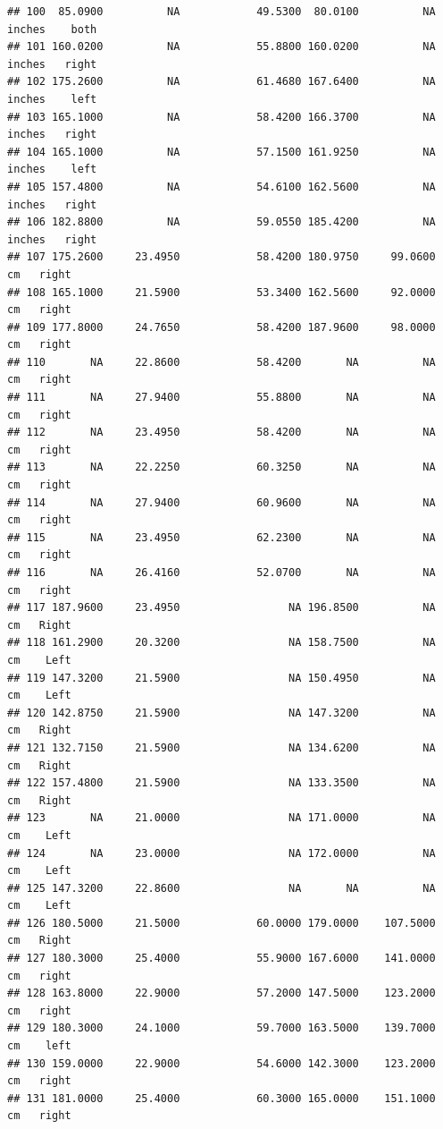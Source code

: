 \documentclass[]{article}
\begin{document}
\begin{verbatim}
## 100  85.0900          NA            49.5300  80.0100          NA inches    both
## 101 160.0200          NA            55.8800 160.0200          NA inches   right
## 102 175.2600          NA            61.4680 167.6400          NA inches    left
## 103 165.1000          NA            58.4200 166.3700          NA inches   right
## 104 165.1000          NA            57.1500 161.9250          NA inches    left
## 105 157.4800          NA            54.6100 162.5600          NA inches   right
## 106 182.8800          NA            59.0550 185.4200          NA inches   right
## 107 175.2600     23.4950            58.4200 180.9750     99.0600     cm   right
## 108 165.1000     21.5900            53.3400 162.5600     92.0000     cm   right
## 109 177.8000     24.7650            58.4200 187.9600     98.0000     cm   right
## 110       NA     22.8600            58.4200       NA          NA     cm   right
## 111       NA     27.9400            55.8800       NA          NA     cm   right
## 112       NA     23.4950            58.4200       NA          NA     cm   right
## 113       NA     22.2250            60.3250       NA          NA     cm   right
## 114       NA     27.9400            60.9600       NA          NA     cm   right
## 115       NA     23.4950            62.2300       NA          NA     cm   right
## 116       NA     26.4160            52.0700       NA          NA     cm   right
## 117 187.9600     23.4950                 NA 196.8500          NA     cm   Right
## 118 161.2900     20.3200                 NA 158.7500          NA     cm    Left
## 119 147.3200     21.5900                 NA 150.4950          NA     cm    Left
## 120 142.8750     21.5900                 NA 147.3200          NA     cm   Right
## 121 132.7150     21.5900                 NA 134.6200          NA     cm   Right
## 122 157.4800     21.5900                 NA 133.3500          NA     cm   Right
## 123       NA     21.0000                 NA 171.0000          NA     cm    Left
## 124       NA     23.0000                 NA 172.0000          NA     cm    Left
## 125 147.3200     22.8600                 NA       NA          NA     cm    Left
## 126 180.5000     21.5000            60.0000 179.0000    107.5000     cm   Right
## 127 180.3000     25.4000            55.9000 167.6000    141.0000     cm   right
## 128 163.8000     22.9000            57.2000 147.5000    123.2000     cm   right
## 129 180.3000     24.1000            59.7000 163.5000    139.7000     cm    left
## 130 159.0000     22.9000            54.6000 142.3000    123.2000     cm   right
## 131 181.0000     25.4000            60.3000 165.0000    151.1000     cm   right

\end{verbatim}
\end{document}
